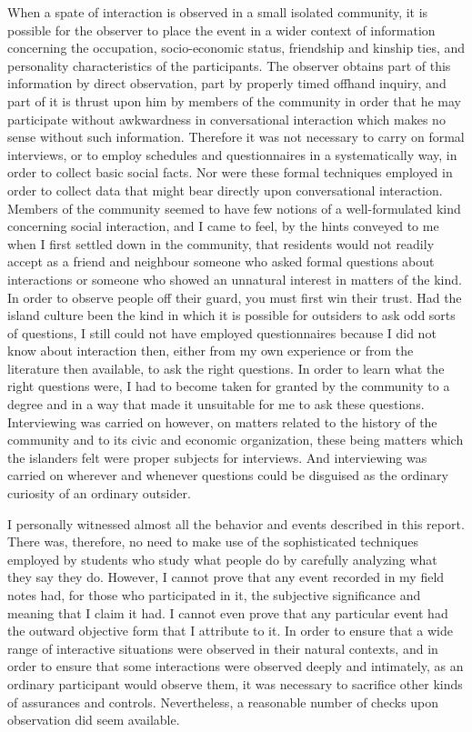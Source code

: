 \documentclass[twoside,symmetric,nobib,justified]{tufte-book}
\begin{document}
When a spate of interaction is observed in a small isolated community,
it is possible for the observer to place the event in a wider context of
information concerning the occupation, socio-economic status, friendship
and kinship ties, and personality characteristics of the participants.
The observer obtains part of this information by direct observation,
part by properly timed offhand inquiry, and part of it is thrust upon
him by members of the community in order that he may participate without
awkwardness in conversational interaction which makes no sense without
such information. Therefore it was not necessary to carry on formal
interviews, or to employ schedules and questionnaires in a
systematically way, in order to collect basic social facts. Nor were
these formal techniques employed in order to collect data that might
bear directly upon conversational interaction. Members of the community
seemed to have few notions of a well-formulated kind concerning social
interaction, and I came to feel, by the hints conveyed to me when I
first settled down in the community, that residents would not readily
accept as a friend and neighbour someone who asked formal questions
about interactions or someone who showed an unnatural interest in
matters of the kind. In order to observe people off their guard, you
must first win their trust. Had the island culture been the kind in
which it is possible for outsiders to ask odd sorts of questions, I
still could not have employed questionnaires because I did not know
about interaction then, either from my own experience or from the
literature then available, to ask the right questions. In order to learn
what the right questions were, I had to become taken for granted by the
community to a degree and in a way that made it unsuitable for me to ask
these questions. Interviewing was carried on however, on matters related
to the history of the community and to its civic and economic
organization, these being matters which the islanders felt were proper
subjects for interviews. And interviewing was carried on wherever and
whenever questions could be disguised as the ordinary curiosity of an
ordinary outsider.

I personally witnessed almost all the behavior and events described in
this report. There was, therefore, no need to make use of the
sophisticated techniques employed by students who study what people do
by carefully analyzing what they say they do. However, I cannot prove
that any event recorded in my field notes had, for those who
participated in it, the subjective significance and meaning that I claim
it had. I cannot even prove that any particular event had the outward
objective form that I attribute to it. In order to ensure that a wide
range of interactive situations were observed in their natural contexts,
and in order to ensure that some interactions were observed deeply and
intimately, as an ordinary participant would observe them, it was
necessary to sacrifice other kinds of assurances and controls.
Nevertheless, a reasonable number of checks upon observation did seem
available.
\end{document}
